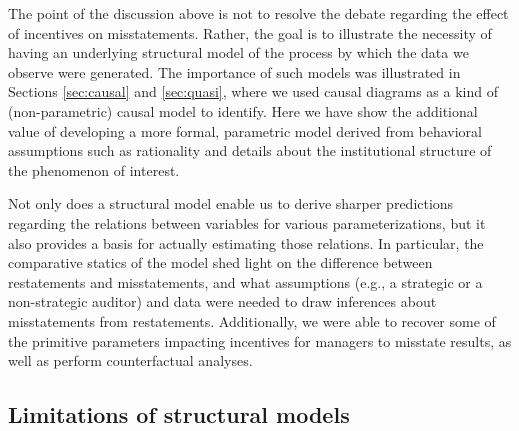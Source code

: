 The point of the discussion above is not to resolve the debate regarding the effect of incentives on misstatements. 
Rather, the goal is to illustrate the necessity of having an underlying structural model of the process by which the data we observe were generated.
The importance of such models was illustrated in Sections \ref{sec:causal} and \ref{sec:quasi}, where we used causal diagrams as a kind of (non-parametric) causal model to identify.
Here we have show the additional value of developing a more formal, parametric model derived from behavioral assumptions such as rationality and details about the institutional structure of the phenomenon of interest.

Not only does a structural model enable us to derive sharper predictions regarding the relations between variables for various parameterizations, but it also provides a basis for actually estimating those relations. 
In particular, the comparative statics of the model shed light on the difference between restatements and misstatements, and what assumptions (e.g., a strategic or a non-strategic auditor) and data were needed to draw inferences about misstatements from restatements. 
Additionally, we were able to recover some of the primitive parameters impacting incentives for managers to misstate results, as well as perform counterfactual analyses.

\subsection{Limitations of structural models}

